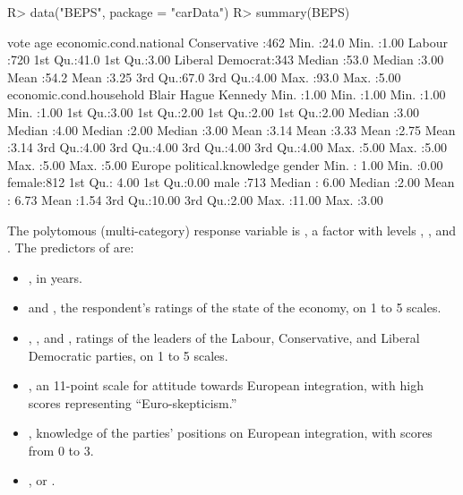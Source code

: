 \documentclass[
]{jss}
\providecommand{\tightlist}{%
  \setlength{\itemsep}{0pt}\setlength{\parskip}{0pt}}
\begin{document}
\begin{CodeChunk}
\begin{CodeInput}
R> data("BEPS", package = "carData")
R> summary(BEPS)
\end{CodeInput}
\begin{CodeOutput}
               vote          age       economic.cond.national
 Conservative    :462   Min.   :24.0   Min.   :1.00
 Labour          :720   1st Qu.:41.0   1st Qu.:3.00
 Liberal Democrat:343   Median :53.0   Median :3.00
                        Mean   :54.2   Mean   :3.25
                        3rd Qu.:67.0   3rd Qu.:4.00
                        Max.   :93.0   Max.   :5.00
 economic.cond.household     Blair          Hague         Kennedy
 Min.   :1.00            Min.   :1.00   Min.   :1.00   Min.   :1.00
 1st Qu.:3.00            1st Qu.:2.00   1st Qu.:2.00   1st Qu.:2.00
 Median :3.00            Median :4.00   Median :2.00   Median :3.00
 Mean   :3.14            Mean   :3.33   Mean   :2.75   Mean   :3.14
 3rd Qu.:4.00            3rd Qu.:4.00   3rd Qu.:4.00   3rd Qu.:4.00
 Max.   :5.00            Max.   :5.00   Max.   :5.00   Max.   :5.00
     Europe      political.knowledge    gender
 Min.   : 1.00   Min.   :0.00        female:812
 1st Qu.: 4.00   1st Qu.:0.00        male  :713
 Median : 6.00   Median :2.00
 Mean   : 6.73   Mean   :1.54
 3rd Qu.:10.00   3rd Qu.:2.00
 Max.   :11.00   Max.   :3.00
\end{CodeOutput}
\end{CodeChunk}

The polytomous (multi-category) response variable is , a
factor with levels , , and
. The predictors of  are:

\begin{itemize}
\tightlist
\item
  , in years.
\item
   and , the
  respondent's ratings of the state of the economy, on 1 to 5 scales.
\item
  , , and , ratings of the leaders
  of the Labour, Conservative, and Liberal Democratic parties, on 1 to 5
  scales.
\item
  , an 11-point scale for attitude towards European
  integration, with high scores representing ``Euro-skepticism.''
\item
  , knowledge of the parties' positions on
  European integration, with scores from 0 to 3.
\item
  ,  or .
\end{itemize}
\end{document}
